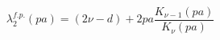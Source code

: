 \begin{equation}
\lambda^{f.p.}_2(pa)=(2\nu-d)+2 p a \frac {K_{\nu-1}(pa)}
{K_\nu(pa)}
\label{fixedpoint}
\end{equation}


